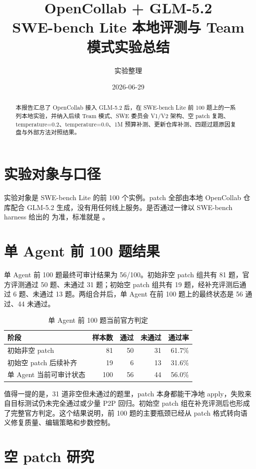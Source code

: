 \documentclass[UTF8,a4paper,11pt]{ctexart}
\title{\textbf{OpenCollab + GLM-5.2}\\SWE-bench Lite 本地评测与 Team 模式实验总结}
\author{实验整理}
\date{2026-06-29}
\begin{document}
\maketitle

\begin{abstract}
本报告汇总了 OpenCollab 接入 GLM-5.2 后，在 SWE-bench Lite 前 100 题上的一系列本地实验，并纳入后续 Team 模式、SWE 委员会 V1/V2 架构、空 patch 复跑、temperature=0.2、temperature=0.0、1M 预算补测、更新仓库补测、四题过题原因复盘与外部方法对照结果。
\end{abstract}

\section{实验对象与口径}

实验对象是 SWE-bench Lite 的前 100 个实例。patch 全部由本地 OpenCollab 仓库配合 GLM-5.2 生成，没有用任何线上服务。是否通过一律以 SWE-bench harness 给出的  为准，标准就是 。
\section{单 Agent 前 100 题结果}

单 Agent 前 100 题最终可审计结果为 56/100。初始非空 patch 组共有 81 题，官方评测通过 50 题、未通过 31 题；初始空 patch 组共有 19 题，经补充评测后通过 6 题、未通过 13 题。两组合并后，单 Agent 在前 100 题上的最终状态是 56 通过、44 未通过。

\begin{table}[H]
\centering
\begin{tabular}{lrrrr}
\toprule
阶段 & 样本数 & 通过 & 未通过 & 通过率 \\
\midrule
初始非空 patch & 81 & 50 & 31 & 61.7\% \\
初始空 patch 后续补齐 & 19 & 6 & 13 & 31.6\% \\
\midrule
单 Agent 当前可审计状态 & 100 & 56 & 44 & 56.0\% \\
\bottomrule
\end{tabular}
\caption{单 Agent 前 100 题当前官方判定}
\end{table}

值得一提的是，31 道非空但未通过的题里，patch 本身都能干净地 apply，失败来自目标测试仍未完全通过或少量 P2P 回归。初始空 patch 组在补充评测后也形成了完整官方判定。这个结果说明，前 100 题的主要瓶颈已经从 patch 格式转向语义修复质量、编辑策略和步数控制。

\section{空 patch 研究}
\end{document}
